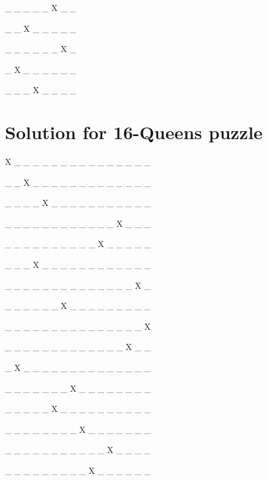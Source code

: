 \documentclass{article}
\begin{document}
\_ \_ \_ \_ \_ X \_ \_ 

\_ \_ X \_ \_ \_ \_ \_ 

\_ \_ \_ \_ \_ \_ X \_ 

\_ X \_ \_ \_ \_ \_ \_ 

\_ \_ \_ X \_ \_ \_ \_ 


\section{Solution for 16-Queens puzzle}

X \_ \_ \_ \_ \_ \_ \_ \_ \_ \_ \_ \_ \_ \_ \_ 

\_ \_ X \_ \_ \_ \_ \_ \_ \_ \_ \_ \_ \_ \_ \_ 

\_ \_ \_ \_ X \_ \_ \_ \_ \_ \_ \_ \_ \_ \_ \_ 

\_ \_ \_ \_ \_ \_ \_ \_ \_ \_ \_ \_ X \_ \_ \_ 

\_ \_ \_ \_ \_ \_ \_ \_ \_ \_ X \_ \_ \_ \_ \_ 

\_ \_ \_ X \_ \_ \_ \_ \_ \_ \_ \_ \_ \_ \_ \_ 

\_ \_ \_ \_ \_ \_ \_ \_ \_ \_ \_ \_ \_ \_ X \_ 

\_ \_ \_ \_ \_ \_ X \_ \_ \_ \_ \_ \_ \_ \_ \_ 

\_ \_ \_ \_ \_ \_ \_ \_ \_ \_ \_ \_ \_ \_ \_ X 

\_ \_ \_ \_ \_ \_ \_ \_ \_ \_ \_ \_ \_ X \_ \_ 

\_ X \_ \_ \_ \_ \_ \_ \_ \_ \_ \_ \_ \_ \_ \_ 

\_ \_ \_ \_ \_ \_ \_ X \_ \_ \_ \_ \_ \_ \_ \_ 

\_ \_ \_ \_ \_ X \_ \_ \_ \_ \_ \_ \_ \_ \_ \_ 

\_ \_ \_ \_ \_ \_ \_ \_ X \_ \_ \_ \_ \_ \_ \_ 

\_ \_ \_ \_ \_ \_ \_ \_ \_ \_ \_ X \_ \_ \_ \_ 

\_ \_ \_ \_ \_ \_ \_ \_ \_ X \_ \_ \_ \_ \_ \_ 
\end{document}
